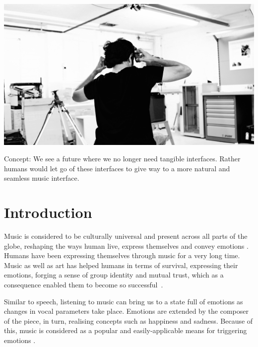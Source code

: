\documentclass[sigchi]{acmart}
\begin{document}
\begin{teaserfigure}
  \includegraphics[width=\textwidth]{acmart-master-2/samples/test2bw.png}
  \caption{Concept: We see a future where we no longer need tangible interfaces. Rather humans would let go of these interfaces to give way to a more natural and seamless music interface.}
  \label{fig:teaser}
\end{teaserfigure}
\maketitle

\section{Introduction}

Music is considered to be culturally universal \cite{campbell1997music, seeger1971reflections} and present across all parts of the globe, reshaping the ways human live, express themselves and convey emotions  \cite{juslin2001music,montagu2017music}. Humans have been expressing themselves through music for a very long time. Music as well as art has helped humans in terms of survival, expressing their emotions, forging a sense of group identity and mutual trust, which as a consequence enabled them to become so successful~\cite{conard2009new}. 


Similar to speech, listening to music can bring us to a state full of emotions as changes in vocal parameters take place. Emotions are extended by the composer of the piece, in turn, realising concepts such as happiness and sadness. Because of this, music is considered as a popular and easily-applicable means for triggering emotions \cite{kappert2019aim}. 
\end{document}
